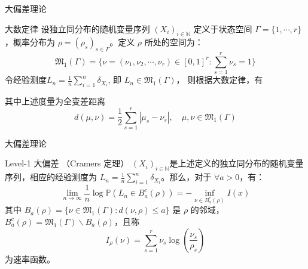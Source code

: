 \documentclass{beamer}
\begin{document}
\begin{frame}{大偏差理论}
	\begin{block}{大数定律}
		设独立同分布的随机变量序列 $\left(\mathit{X}_i \right)_{i\in \mathbb{N}}$ 定义于状态空间 $\Gamma=\{1, \cdots, r\}$，概率分布为 $\rho=(\rho_s)_{s \in \Gamma}$。定义 $\rho$ 所处的空间为：
		$$
			\mathfrak{M}_1(\Gamma) = \{\nu = (\nu_1, \nu_2, \cdots, \nu_r)\in [0,1]^r:\sum_{s=1}^r \nu_s = 1\}
		$$
		令经验测度$\mathit{L}_n = \frac{1}{n}\sum_{i=1}^{n}\delta_{\mathit{X}_i} $, 即 $\mathit{L}_n \in \mathfrak{M}_1(\Gamma)$，
		则根据大数定律，有
		\begin{figure}
			\centering
		\end{figure}
		其中上述度量为全变差距离
		$$
			d(\mu, \nu) = \frac{1}{2} \sum_{s=1}^r |\mu_s - \nu_s|, \quad \mu, \nu \in \mathfrak{M}_1(\Gamma)
		$$
	\end{block}
\end{frame}

\begin{frame}{大偏差理论}
	\begin{block}{Level-1 大偏差 （Cramers 定理）}
		$(\mathit{X}_i)_{i\in \mathbb{N}}$是上述定义的独立同分布的随机变量序列，相应的经验测度为 $\mathit{L}_n = \frac{1}{n} \sum_{i=1}^n \delta_{\mathit{X}_i}$。那么，对于 $\forall a>0$，有：
		$$
			\lim_{n \rightarrow \infty} \frac{1}{n} \log \mathbb{P} \left(\mathit{L}_n \in \mathit{B}_a^c(\rho)\right) = -\inf_{\nu \in \mathit{B}_a^c(\rho)} \mathit{I}(x)
		$$
		其中 $\mathit{B}_a(\rho)=\{\nu \in \mathfrak{M}_1(\Gamma): d(\nu,  \rho) \le a\}$ 是 $\rho$ 的邻域，$\mathit{B}_a^c(\rho) = \mathfrak{M}_1(\Gamma) \backslash  \mathit{B}_a(\rho)$，且称
		$$
			\mathit{I}_{\rho}(\nu) = \sum_{s=1}^r \nu_s \log \left(\frac{\nu_s}{\rho_s}\right)
		$$
		为速率函数。
	\end{block}
\end{frame}
\end{document}
